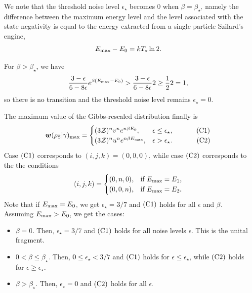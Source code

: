 \documentclass[pra,
aps,
twocolumn,
superscriptaddress,
groupedaddress,
nofootinbib,
reprint
]{revtex4-1}
\begin{document}
We note that the threshold noise level $\epsilon_\star$ becomes $0$ when $\beta = \beta_\star$, namely the difference between the maximum energy level and the level associated with the state negativity is equal to the energy extracted from a single particle Szilard's engine,
\begin{equation}
	E_{\rm{max}} - E_0 = kT_{\star} \ln2.
\end{equation}

For $\beta > \beta_\star$, we have
\begin{equation*}
	\frac{3-\epsilon}{6-8\epsilon} e^{\beta (E_{\rm{max}} - E_0)} > \frac{3-\epsilon}{6-8\epsilon} 2 \geq \frac{1}{2}2 = 1,
\end{equation*}
so there is no transition and the threshold noise level remains $\epsilon_\star = 0$.

The maximum value of the Gibbs-rescaled distribution finally is
\begin{equation}
\bm{w}(\rho_{\rm{S}} | \gamma)_{\rm{max}} =
	\begin{cases}
		(3\mathcal{Z})^{n} v^n e^{n\beta E_0}, &\epsilon \leq \epsilon_{\star},\ \hspace{30pt}\rm{(C1)}	\\
		(3\mathcal{Z})^{n} u^n e^{n\beta E_{\rm{max}}}, &\epsilon > \epsilon_{\star}.\ \hspace{32pt}\rm{(C2)} 
	\end{cases}
\end{equation}
Case $\rm{(C1)}$ corresponds to $(i,j,k) = (0,0,0)$, while case $\rm{(C2)}$ corresponds to the  the conditions 
\begin{equation}
	(i,j,k) = 
	\begin{cases}
	(0,n,0), &\text{if } E_{\rm{max}} = E_1, \\
	(0,0,n), &\text{if } E_{\rm{max}} = E_2.
	\end{cases}
\end{equation}
Note that if $E_{\rm{max}} = E_0$, we get $\epsilon_{\star} = 3/7$ and $\rm{(C1)}$ holds for all $\epsilon$ and $\beta$.
Assuming $E_{\rm{max}} > E_0$, we get the cases:
\begin{itemize}
	\item $\beta = 0$. Then, $\epsilon_{\star} = 3/7$ and $\rm{(C1)}$ holds for all noise levels $\epsilon$.
	This is the unital fragment.
	\item $0 < \beta \leq \beta_{\star}$. Then, $0 \leq \epsilon_{\star} < 3/7$ and $\rm{(C1)}$ holds for $\epsilon \leq \epsilon_{\star}$, while $\rm{(C2)}$ holds for $\epsilon \geq \epsilon_{\star}$.
	\item $\beta > \beta_{\star}$. Then, $ \epsilon_{\star} = 0$ and $\rm{(C2)}$ holds for all $\epsilon$.
\end{itemize}
\end{document}
